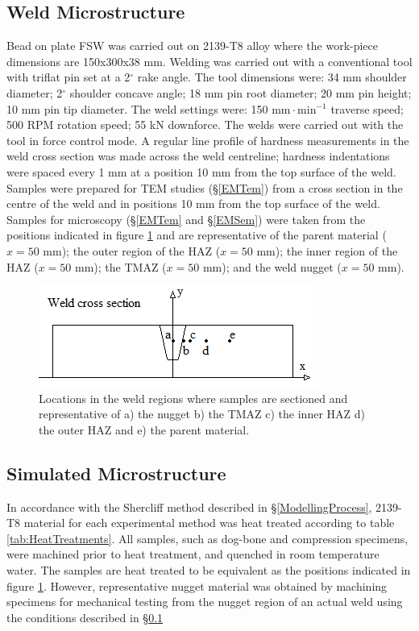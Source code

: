 	\subsection{Weld Microstructure}
	\label{EMWeldMicrostructure}
	Bead on plate FSW was carried out on 2139-T8 alloy where the work-piece dimensions are 150x300x38 mm. Welding was carried out with a conventional tool with triflat pin set at a 2$^\circ$ rake angle. The tool dimensions were: 34 mm shoulder diameter; 2$^\circ$ shoulder concave angle; 18 mm pin root diameter; 20 mm pin height; 10 mm pin tip diameter. The weld settings were: 150 $\text{mm}\!\cdot\!\text{min}^{-1}$ traverse speed; 500 RPM rotation speed; 55 kN downforce. The welds were carried out with the tool in force control mode. A regular line profile of hardness measurements in the weld cross section was made across the weld centreline; hardness indentations were spaced every 1 mm at a position 10 mm from the top surface of the weld. Samples were prepared for TEM studies (\S\ref{EMTem}) from a cross section in the centre of the weld and in positions 10 mm from the top surface of the weld. Samples for microscopy (\S\ref{EMTem} and \S\ref{EMSem}) were taken from the positions indicated in figure \ref{fig:TEMpositions} and are representative of the parent material ($x=50$ mm); the outer region of the HAZ ($x=50$ mm); the inner region of the HAZ ($x=50$ mm); the TMAZ ($x=50$ mm); and the weld nugget ($x=50$ mm). %
	\begin{figure}[h!]
		\centering
		\includegraphics[width=1\linewidth]{TEMpositions}
		\caption[Dogbone]{Locations in the weld regions where samples are sectioned and representative of a) the nugget b) the TMAZ c) the inner HAZ d) the outer HAZ and e) the parent material.}	
		\label{fig:TEMpositions}
	\end{figure} 
	\subsection{Simulated Microstructure}
	\label{EMSimulateMicrostructure}
	In accordance with the Shercliff method \cite{Shercliff1990,Shercliff1990a} described in \S\ref{ModellingProcess}, 2139-T8 material for each experimental method was heat treated according to table \ref{tab:HeatTreatments}. All samples, such as dog-bone and compression specimens, were machined prior to heat treatment, and quenched in room temperature water. The samples are heat treated to be equivalent as the positions indicated in figure \ref{fig:TEMpositions}. However, representative nugget material was obtained by machining specimens for mechanical testing from the nugget region of an actual weld using the conditions described in \S\ref{EMWeldMicrostructure}
	
